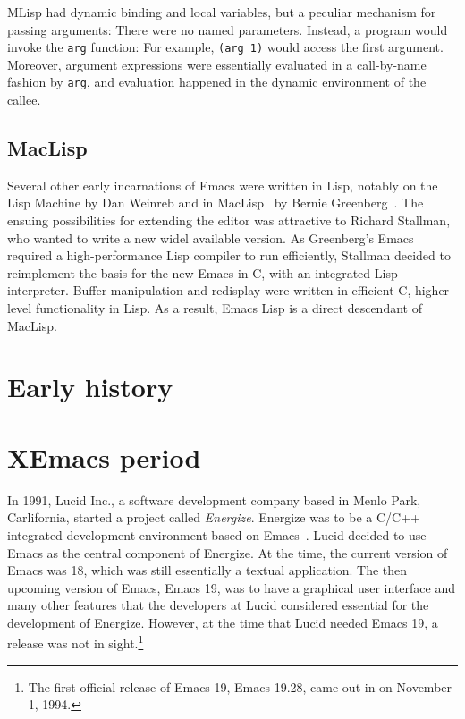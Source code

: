 \documentclass[format=acmsmall, review=false, screen=true]{acmart}
\begin{document}
MLisp had dynamic binding and local variables, but a peculiar
mechanism for passing arguments:  There were no named
parameters.  Instead, a program would invoke the \texttt{arg}
function: For example, \texttt{(arg 1)} would access the first
argument.  Moreover, argument expressions were essentially evaluated
in a call-by-name fashion by \texttt{arg}, and evaluation happened in
the dynamic environment of the callee.

\subsection{MacLisp}

Several other early incarnations of Emacs were written in Lisp,
notably on the Lisp Machine by Dan Weinreb and in
MacLisp~\cite{Moon1974} by Bernie Greenberg~\cite{Stallman2002}.  The
ensuing possibilities for extending the editor was attractive to
Richard Stallman, who wanted to write a new widel available version.
As Greenberg's Emacs required a high-performance Lisp compiler to run
efficiently, Stallman decided to reimplement the basis for the new
Emacs in C, with an integrated Lisp interpreter.  Buffer manipulation
and redisplay were written in efficient C, higher-level functionality
in Lisp.  As a result, Emacs Lisp is a direct descendant of MacLisp.

\section{Early history}         %




\section{XEmacs period}         %

In 1991, Lucid Inc., a software development company based in Menlo
Park, Carlifornia, started a project called \textit{Energize}.
Energize was to be a C/C++ integrated development environment based on
Emacs~\cite{GabrielLetter}.  Lucid decided to use Emacs as the central
component of Energize.  At the time, the current version of Emacs was
18, which was still essentially a textual application.  The then
upcoming version of Emacs, Emacs 19, was to have a graphical user
interface and many other features that the developers at Lucid
considered essential for the development of Energize.  However, at the
time that Lucid needed Emacs 19, a release was not in
sight.\footnote{The first official release of Emacs 19, Emacs
  19.28, came out in on November 1, 1994.}
\end{document}
